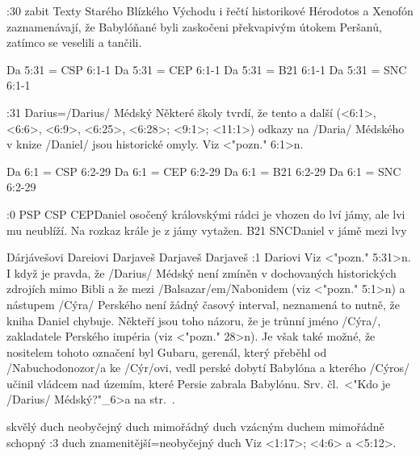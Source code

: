 :30 {zabit} Texty Starého Blízkého Východu i řečtí historikové Hérodotos a Xenofón zaznamenávají, že Babylóňané byli zaskočeni překvapivým útokem Peršanů, zatímco se veselili a tančili.

\renum Da 5:31 = CSP 6:1-1
\renum Da 5:31 = CEP 6:1-1
\renum Da 5:31 = B21 6:1-1
\renum Da 5:31 = SNC 6:1-1 

:31 {Darius}={\x/Darius/ Médský} Některé školy tvrdí, že tento a další 
(<6:1>, <6:6>, <6:9>, <6:25>, <6:28>; <9:1>; <11:1>)     
odkazy na \x/Daria/ Médského v knize \x/Daniel/ jsou historické omyly. Viz <"pozn." 6:1>n. 

\renum Da 6:1 = CSP 6:2-29
\renum Da 6:1 = CEP 6:2-29
\renum Da 6:1 = B21 6:2-29
\renum Da 6:1 = SNC 6:2-29

:0 {} 
% 
        {PSP}{}%
        {CSP}{}%
        {CEP}{Daniel osočený královskými rádci je vhozen do lví jámy, ale lvi
             mu neublíží. Na rozkaz krále je z jámy vytažen.}%
        {B21}{}%
        {SNC}{Daniel v jámě mezi lvy}%

             

    {Dárjávešovi}   %
    {Dareiovi}   %
    {Darjaveš}  %
    {Darjaveš}  %
    {Darjaveš}   %
:1 {Dariovi} Viz <"pozn." 5:31>n.      
I když je pravda, že \x/Darius/ Médský není zmíněn v dochovaných historických zdrojích mimo Bibli a že mezi \x/Balsazar/em/Nabonidem (viz <"pozn." 5:1>n) a nástupem \x/Cýra/ Perského není žádný časový interval, neznamená to nutně, že kniha Daniel chybuje. Někteří jsou toho názoru, že  je trůnní jméno \x/Cýra/, zakladatele Perského impéria (viz <"pozn." 28>n). 
Je však také možné, že nositelem tohoto označení byl Gubaru, gerenál, který přeběhl od  \x/Nabuchodonozor/a ke \x/Cýr/ovi, vedl perské dobytí Babylóna a kterého  \x/Cýros/ učinil vládcem nad územím, které Persie zabrala Babylónu. 
Srv. čl.~<"Kdo je \x/Darius/ Médský?"_6>a na str.~\pg.


    {skvělý duch}   %
    {neobyčejný duch}   %
    {mimořádný duch}  %
    {vzácným duchem}  %
    {mimořádně schopný}   %
:3 {duch znamenitější}={neobyčejný duch} Viz  <1:17>;  <4:6> a <5:12>.



